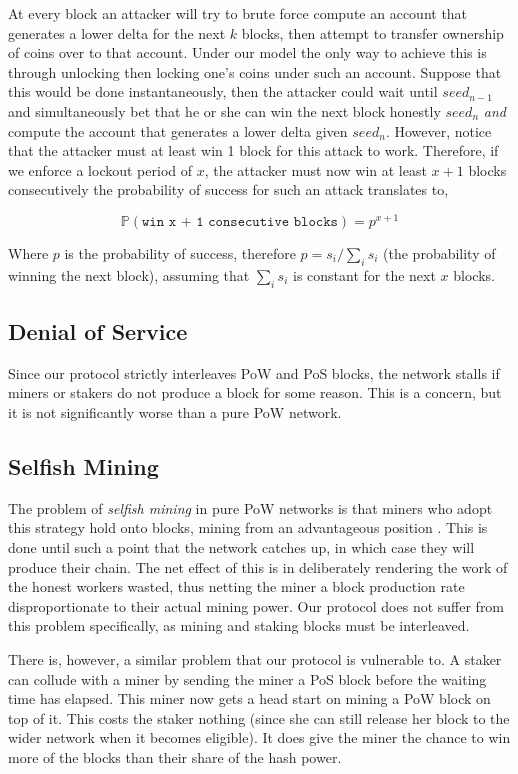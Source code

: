 At every block an attacker will try to brute force compute an account that generates a lower delta
for the next $k$ blocks, then attempt to transfer ownership of coins over to that account. Under our model
the only way to achieve this is through unlocking then locking one's coins under such an account.
Suppose that this would be done instantaneously, then the attacker could wait until $seed_{n-1}$ and
simultaneously bet that he or she can win the next block honestly $seed_n$ \textit{and} compute
the account that generates a lower delta given $seed_n$. However, notice that the attacker must
at least win 1 block for this attack to work. Therefore, if we enforce a lockout period of $x$,
the attacker must now win at least $x+1$ blocks consecutively the probability of
success for such an attack translates to,

\begin{equation}
    \label{eq:attacker_success}
    \mathbb{P}(\texttt{win x + 1 consecutive blocks})=p^{x+1}
\end{equation}

Where $p$ is the probability of success, therefore $p=s_{i}/\sum_i{s_i}$ (the probability of winning
the next block), assuming that $\sum_i{s_i}$ is constant for the next $x$ blocks.

\subsection{Denial of Service}

Since our protocol strictly interleaves PoW and PoS blocks, the network stalls if miners 
or stakers do not produce a block for some reason. This is a concern, but it is not 
significantly worse than a pure PoW network. 

\subsection{Selfish Mining}

The problem of \textit{selfish mining} in pure PoW networks is that miners who
adopt this strategy hold onto blocks, mining from an advantageous position \cite{selfish_mining}.
This is done until such a point that the network catches up, in which case they
will produce their chain. The net effect of this is in deliberately rendering
the work of the honest workers wasted, thus netting the miner a block production
rate disproportionate to their actual mining power. Our protocol does not suffer from this
problem specifically, as mining and staking blocks must be interleaved.

There is, however, a similar problem that our protocol is vulnerable to. A staker can collude 
with a miner by sending the miner a PoS block before the waiting time has elapsed.
This miner now gets a head start on mining a PoW block on top of it. This costs the staker
nothing (since she can still release her block to the wider network when it becomes
eligible). It does give the miner the chance to win more of the blocks than their
share of the hash power.

